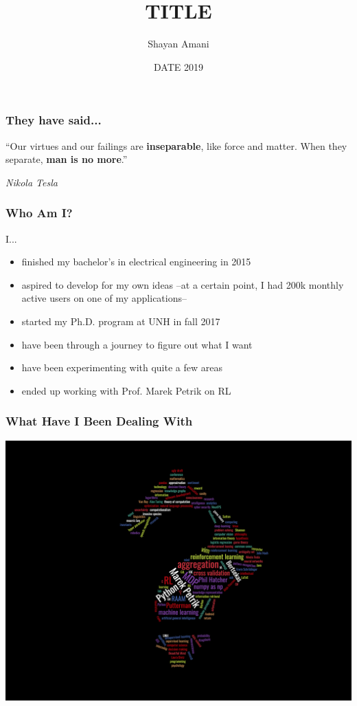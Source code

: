 \documentclass{beamer}
\title{TITLE}
\author{Shayan Amani}
\date{DATE 2019}
\institute{Department of Computer Science, University of New Hampshire}
\begin{document}
  \begin{frame}
    \titlepage
  \end{frame}
  
  

\begin{frame}
\frametitle{They have said...}

\Huge{``Our virtues and our failings are \textbf{inseparable}, like force and matter. When they separate, \textbf{man is no more}.''}

\hfill \LARGE{\textit{Nikola Tesla}}

    
\end{frame}

\begin{frame}
    \frametitle{Who Am I?}
    
    I...
    \begin{itemize}
        \item finished my bachelor's in electrical engineering in 2015
        \item aspired to develop for my own ideas --at a certain point, I had 200k monthly active users on one of my applications--
        \item started my Ph.D. program at UNH in fall 2017
        \item have been through a journey to figure out what I want
        \item have been experimenting with quite a few areas
        \item ended up working with Prof. Marek Petrik on RL
    \end{itemize}
    
\end{frame}

\begin{frame}
    \frametitle{What Have I Been Dealing With}
    \includegraphics[width=1\columnwidth]{wordcloud.png}
    
\end{frame}
\end{document}
